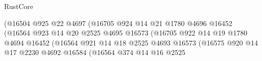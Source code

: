 \begin{lexlean}{RustCore}
\begin{coremodule}
                                              (@16504
                                                @925
                                                @22
                                                @4697
                                                (@16705
                                                  @924
                                                  @14
                                                  @21
                                                  @1780
                                                  @4696
                                                  @16452
                                                  (@16564
                                                    @923
                                                    @14
                                                    @20
                                                    @2525
                                                    @4695
                                                    @16573
                                                    (@16705
                                                      @922
                                                      @14
                                                      @19
                                                      @1780
                                                      @4694
                                                      @16452
                                                      (@16564
                                                        @921
                                                        @14
                                                        @18
                                                        @2525
                                                        @4693
                                                        @16573
                                                        (@16575
                                                          @920
                                                          @14
                                                          @17
                                                          @2230
                                                          @4692
                                                          @16584
                                                          (@16564
                                                            @374
                                                            @14
                                                            @16
                                                            @2525

\end{coremodule}
\end{lexlean}
